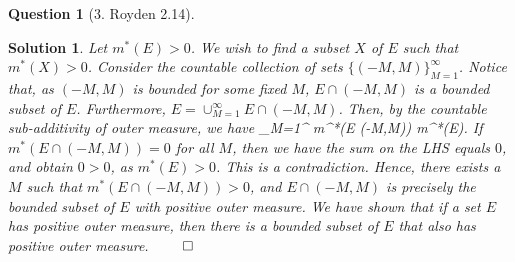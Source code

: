 \documentclass{article} %
\def\eQb#1\eQe{\begin{eqnarray*}#1\end{eqnarray*}}
\theoremstyle{quest}
\newtheorem*{question}{Question}
\newtheorem*{solution}{Solution}
\begin{document}
\pagebreak

\begin{question}[3. Royden 2.14]
\end{question}
\begin{solution}
Let $m^{*}(E) > 0$. We wish to find a subset $X$ of $E$ such that $m^{*}(X) > 0$. 
Consider the countable collection of sets $\{ (-M,M) \}_{M=1}^{\infty}$. Notice that,
as $(-M,M)$ is bounded for some fixed $M$,
$E \cap (-M,M)$ is a bounded subset of $E$. Furthermore,
$ E = \cup_{M=1}^{\infty} E\cap (-M,M)$.
Then, by the countable sub-additivity of outer measure, we have
\eQb
\sum_{M=1}^{\infty} m^{*}(E \cap (-M,M)) \geq m^{*}(E).
\eQe
If $m^{*}(E \cap (-M,M)) = 0$ for all $M$, then we have the sum on the LHS equals $0$, and obtain
$0 > 0$, as $m^{*}(E) > 0$. This is a contradiction. Hence, there exists a $M$ such that
$m^{*}(E \cap (-M,M)) > 0$, and $E \cap (-M,M)$ is precisely the bounded subset of $E$ with
positive outer measure. We have shown that if a set $E$ has positive outer measure,
then there is a bounded subset of $E$ that also has positive outer measure. $\qed$

\end{solution}

\bigskip
\end{document}

